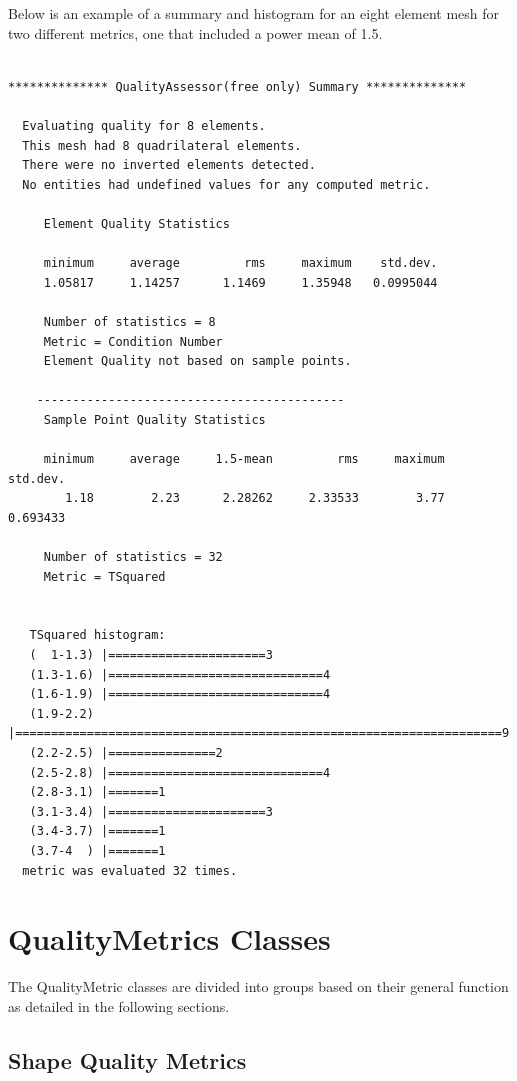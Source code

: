   Below is an example of a summary and histogram for an eight element mesh for two different metrics, one that included a power mean of 1.5.


\begin{verbatim}

************** QualityAssessor(free only) Summary **************

  Evaluating quality for 8 elements.
  This mesh had 8 quadrilateral elements.
  There were no inverted elements detected.
  No entities had undefined values for any computed metric.

     Element Quality Statistics

     minimum     average         rms     maximum    std.dev.
     1.05817     1.14257      1.1469     1.35948   0.0995044

     Number of statistics = 8
     Metric = Condition Number
     Element Quality not based on sample points.

    -------------------------------------------
     Sample Point Quality Statistics

     minimum     average     1.5-mean         rms     maximum    std.dev.
        1.18        2.23      2.28262     2.33533        3.77    0.693433

     Number of statistics = 32
     Metric = TSquared


   TSquared histogram:
   (  1-1.3) |======================3
   (1.3-1.6) |==============================4
   (1.6-1.9) |==============================4
   (1.9-2.2) |====================================================================9
   (2.2-2.5) |===============2
   (2.5-2.8) |==============================4
   (2.8-3.1) |=======1
   (3.1-3.4) |======================3
   (3.4-3.7) |=======1
   (3.7-4  ) |=======1
  metric was evaluated 32 times.

\end{verbatim}

\section{QualityMetrics Classes}

The QualityMetric classes are divided into groups based on their general function as detailed in the following sections.

\subsection{Shape Quality Metrics}

